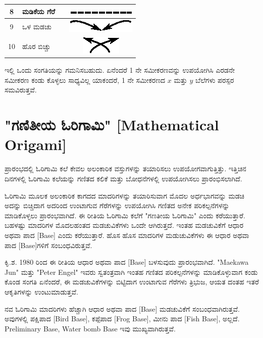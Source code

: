 \begin{longtable}[l]{|c|l|l|c|}
\hline
8 & ಮಡಿಕೆಯ ಗೆರೆ & & {\includegraphics[scale=.98]{src/figure/chap1/fig1a_8.eps}}\\
\hline
9 & ಒಳ ಮಡಚು & & {\includegraphics[scale=.98]{src/figure/chap1/fig1a_10.eps}}\\
\hline
10 & ಹೊರ ಬಿಚ್ಚು & & {\includegraphics[scale=.98]{src/figure/chap1/fig1a_11.eps}}\\
\hline
\end{longtable}

\smallskip

ಇಲ್ಲಿ ಒಂದು ಸಂಗತಿಯನ್ನು ಗಮನಿಸಬಹುದು. ಏನೆಂದರೆ 1 ನೇ ಸಮೀಕರಣವನ್ನು ಉಪಯೋಗಿಸಿ ಎರಡನೇ ಸಮೀಕರಣ ಕಂಡು ಕೊಳ್ಳಲು ಸಾಧ್ಯವಿಲ್ಲ ಯಾಕಂದರೆ, 1 ನೇ ಸಮೀಕರಣದ $x$ ಮತ್ತು $y$  ಬೆಲೆಗಳು ಪರಸ್ಪರ ಸಮವಿರುತ್ತವೆ. 


\section*{"ಗಣಿತೀಯ ಓರಿಗಾಮಿ" [Mathematical Origami]}
ಪ್ರಾರಂಭದಲ್ಲಿ ಓರಿಗಾಮಿ ಕಲೆ ಕೇವಲ ಅಲಂಕಾರಿಕ ವಸ್ತುಗಳನ್ನು ತಯಾರಿಸಲು ಉಪಯೋಗವಾಗುತ್ತಿತ್ತು. ಇತ್ತಿಚಿನ ದಿನಗಳಲ್ಲಿ ಓರಿಗಾಮಿ ಕಲೆಯನ್ನು ಗಣಿತದ ಕಲಿಕೆ ಮತ್ತು ಬೋಧನೆಗಳಲ್ಲಿ ಉಪಯೋಗಿಸಲು ಪ್ರಾರಂಭಿಸಲಾಗಿದೆ. 

ಓರಿಗಾಮಿ ಮೂಲಕ ಅಲಂಕಾರಿಕ ಕಾಗದದ ಮಾದರಿಗಳನ್ನು ತಯಾರಿಸುವಾಗ ಮೊದಲ ಅರ್ಧಭಾಗವನ್ನು ಮಡಚಿ ಅದನ್ನು ಬಿಚ್ಚಿದಾಗ ಅದರಿಂದ ಉಂಟಾಗುವ ಗೆರೆಗಳನ್ನು ಉಪಯೋಗಿಸಿ ಗಣಿತದ ಅನೇಕ ಪರಿಕಲ್ಪನೆಗಳನ್ನು ಮಾಡಿಕೊಳ್ಳಲು ಪ್ರಾರಂಭವಾಗಿದೆ. ಈ ರೀತಿಯ ಓರಿಗಾಮಿ ಕಲೆಗೆ "ಗಣತೀಯ ಓರಿಗಾಮಿ" ಎಂದು ಕರೆಯುತ್ತಾರೆ. ಬಹಳಷ್ಟು ಮಾದರಿಗಳ ಮೊದಲಹಂತದ ಮಡಚುವಿಕೆಗಳು ಒಂದೇ ಆಗಿರುತ್ತದೆ. ಇಂತಹ ಮಡಚುವಿಕೆಗೆ ಆಧಾರ ಅಥವಾ ಪಾದ [Base] ಎಂದು ಕರೆಯುತ್ತಾರೆ. ಹೊಸ ಹೊಸ ಮಾದರಿಗಳ ಮಡುಚುವಿಕೆಗಳು ಈ ಆಧಾರ ಅಥವಾ ಪಾದ [Base]ಗಳಿಗೆ ಸಂಬಂಧವಿರುತ್ತವೆ.

ಕಿೃ.ಶ. 1980 ರಿಂದ ಈ ರೀತಿಯ ಆಧಾರ ಅಥವಾ ಪಾದ [Base] ಬಳಸುವುದು ಪ್ರಾರಂಭವಾಗಿದೆ. "Maekawa Jun" ಮತ್ತು "Peter Engel" ಇವರು ಸ್ವತಂತ್ರವಾಗಿ ಇಂತಹ ಗಣಿತದ ಪರಿಕಲ್ಪನೆಗಳನ್ನು ಮಾಡಿಕೊಳ್ಳುವಾಗ ಕಂಡು ಕೊಂಡ ಸಂಗತಿ ಏನೆಂದರೆ, ಈ ಮಡಚುವಿಕೆಗಳನ್ನು ಬಿಟ್ಟಿದಾಗ ಉಂಟಾಗುವ ಗೆರೆಗಳು ತ್ರಿಭುಜ, ಆಯತ ದಂತಹ ಇತರೆ ಆಕೃತಿಗಳನ್ನು ಉಂಟುಮಾಡುತ್ತವೆ. 

ನವ ಓರಿಗಾಮಿ ಮಾದರಿಗಳು ಹೆಚ್ಚಾಗಿ ಆಧಾರ ಅಥವಾ ಪಾದ [Base] ಮಡಚುವಿಕೆಗೆ ಸಂಬಂಧವಾಗಿರುತ್ತವೆ. ಅವುಗಳಲ್ಲಿ ಪಕ್ಷಿಪಾದ [Bird Base], ಕಪ್ಪೆಪಾದ [Frog Base], ಮೀನು ಪಾದ [Fish Base], ಅಲ್ಲದೆ. Preliminary Base, Water bomb Base ಇವು ಮುಖ್ಯವಾಗಿರುತ್ತವೆ. 

